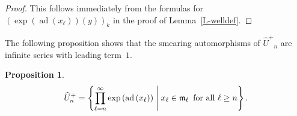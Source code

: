 \documentclass[11pt,letterpaper]{amsart}
\newcounter{thecounter}
\numberwithin{thecounter}{section}
\newtheorem{proposition}[thecounter]{Proposition}
\theoremstyle{definition}
\DeclareMathOperator{\ad}{ad}
\newcommand{\Uhp}{{\widehat{U}^+}}
\begin{document}
\begin{longver}
\begin{proof}
This follows immediately from the formulas for $\left(\exp\left(\ad\left(x_\ell\right) \right) \left(y \right) \right)_k$ in the proof of Lemma~\ref{L-welldef}.
\end{proof}
\end{longver}


The following proposition shows that the smearing automorphisms of $\Uhp_n$ are infinite series with leading term~$1$.
\begin{proposition}\label{P-Uprod}
$$\displaystyle \Uhp_n = \left\{\prod_{\ell=n}^\infty \exp\left(\ad\left(x_\ell \right) \right) \;\middle|\; x_\ell\in{\frak m}_\ell \,
\text{ for all $\ell\ge n$}\right\}.$$
\end{proposition}
\end{document}
